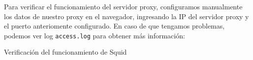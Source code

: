 Para verificar el funcionamiento del servidor proxy, configuramos manualmente los datos de nuestro proxy en el navegador, ingresando la IP del servidor proxy y el puerto anteriomente configurado.
En caso de que tengamos problemas, podemos ver log \texttt{access.log} para obtener más información:

\begin{listing}[H]
  \caption{Verificación del funcionamiento de Squid}
  \label{soa:tecnologias:squid-cache07:bash-preparacion}
\end{listing}
